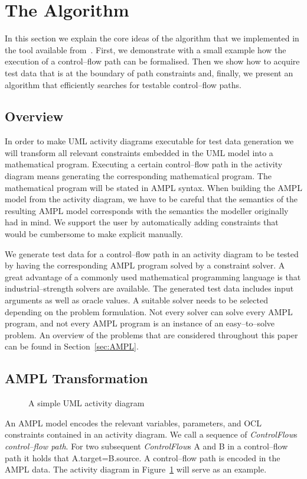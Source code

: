 \documentclass[runningheads,a4paper]{llncs}%
\newcommand{\UMLType}[1]{\textsf{\textit{#1}}} %
\newcommand{\UMLReference}[1]{\textsf{\textit{#1}}} %
\begin{document}
\section{The Algorithm}%
\label{sec:Algorithm}%
In this section we explain the core ideas of the algorithm that we implemented
in the tool available from~\cite{PartegWebsite}. First, we demonstrate with a
small example how the execution of a control--flow path can be formalised. Then
we show how to acquire test data that is at the boundary of path constraints
and, finally, we present an algorithm that efficiently searches for testable
control--flow paths.%
\subsection{Overview}%
In order to make UML activity diagrams executable for test data generation we
will transform all relevant constraints embedded in the UML model into a
mathematical program. Executing a certain control--flow path in the activity
diagram means generating the corresponding mathematical program. The
mathematical program will be stated in AMPL syntax. 
When building the AMPL model from the activity diagram, we have to be careful
that the semantics of the resulting AMPL model corresponds with the semantics
the modeller originally had in mind. We support the user by automatically adding
constraints that would be cumbersome to make explicit manually.

We generate test data for a control--flow path in an activity diagram to be
tested by having the corresponding AMPL program solved by a constraint solver.
A great advantage of a commonly used mathematical programming language is that
industrial--strength solvers are available. The generated test data includes
input arguments as well as oracle values. A suitable solver needs to be selected
depending on the problem formulation. Not every solver can solve every AMPL
program, and not every AMPL program is an instance of an easy--to--solve
problem. An overview of the problems that are considered throughout this paper
can be found in Section~\ref{sec:AMPL}.
\subsection{AMPL Transformation}%
\label{sec:AMPLTransformation}%
\begin{figure}%
\def\svgwidth{\textwidth}%
\graphicspath{{./pics/}}%
%
\caption{A simple UML activity diagram}%
\label{fig:AssignmentDecision}%
\end{figure}%
An AMPL model encodes the relevant variables, parameters, and OCL constraints
contained in an activity diagram. We call a sequence of
\UMLReference{ControlFlow}s \emph{control--flow path}. For two subsequent
\UMLType{ControlFlow}s A and B in a control--flow path it holds that
A.target=B.source. A control--flow path is encoded in the AMPL data. The
activity diagram in Figure~\ref{fig:AssignmentDecision} will serve as an
example.
\end{document}
